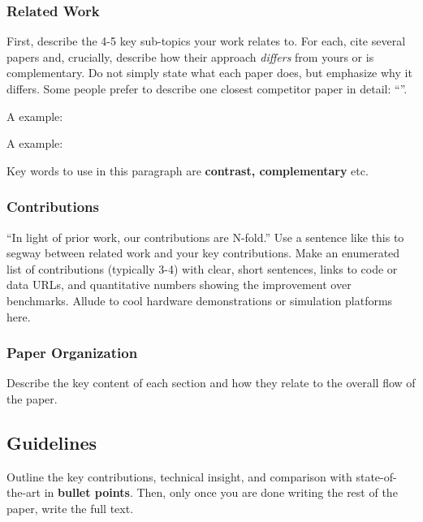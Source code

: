 \subsubsection{Related Work}
First, describe the 4-5 key sub-topics your work relates to. For each, cite several papers and, crucially, describe how their approach \textit{differs} from yours or is complementary. Do not simply state what each paper does, but emphasize why it differs. Some people prefer to describe one closest competitor paper in detail: ``''.

A  example:

\begin{quote}
\end{quote}

A  example:

\begin{quote}
\end{quote}

Key words to use in this paragraph are \textbf{contrast, complementary} etc.

\subsubsection{Contributions }
``In light of prior work, our contributions are N-fold.'' Use a sentence like this to segway between related work and your key contributions. Make an enumerated list of contributions (typically 3-4) with clear, short sentences, links to code or data URLs, and quantitative numbers showing the improvement over benchmarks. 
Allude to cool hardware demonstrations or simulation platforms here.

\subsubsection{Paper Organization }
Describe the key content of each section and how they relate to the overall flow of the paper.

\subsection{Guidelines}
Outline the key contributions, technical insight, and comparison with state-of-the-art in \textbf{bullet points}. Then, only once you are done writing the rest of the paper, write the full text.

